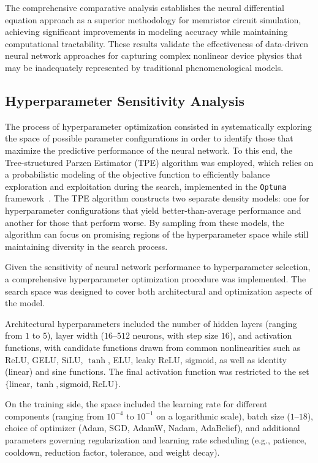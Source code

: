 \documentclass[11pt, oneside]{article}
\begin{document}
The comprehensive comparative analysis establishes the neural differential equation approach as a superior methodology for memristor circuit simulation, achieving significant improvements in modeling accuracy while maintaining computational tractability. These results validate the effectiveness of data-driven neural network approaches for capturing complex nonlinear device physics that may be inadequately represented by traditional phenomenological models.

\subsection{Hyperparameter Sensitivity Analysis}

The process of hyperparameter optimization consisted in systematically exploring the space of possible parameter configurations in order to identify those that maximize the predictive performance of the neural network. To this end, the Tree-structured Parzen Estimator (TPE) algorithm was employed, which relies on a probabilistic modeling of the objective function to efficiently balance exploration and exploitation during the search, implemented in the \verb|Optuna| framework~\cite{akiba2019optuna}. The TPE algorithm constructs two separate density models: one for hyperparameter configurations that yield better-than-average performance and another for those that perform worse. By sampling from these models, the algorithm can focus on promising regions of the hyperparameter space while still maintaining diversity in the search process.


Given the sensitivity of neural network performance to hyperparameter selection, a comprehensive hyperparameter optimization procedure was implemented. The search space was designed to cover both architectural and optimization aspects of the model.

Architectural hyperparameters included the number of hidden layers (ranging from $1$ to $5$), layer width ($16$--$512$ neurons, with step size $16$), and activation functions, with candidate functions drawn from common nonlinearities such as ReLU, GELU, SiLU, $\tanh$, ELU, leaky ReLU, sigmoid, as well as identity (linear) and sine functions. The final activation function was restricted to the set $\{\text{linear}, \tanh, \text{sigmoid}, \text{ReLU}\}$.

On the training side, the space included the learning rate for different components (ranging from $10^{-4}$ to $10^{-1}$ on a logarithmic scale), batch size ($1$--$18$), choice of optimizer (Adam, SGD, AdamW, Nadam, AdaBelief), and additional parameters governing regularization and learning rate scheduling (e.g., patience, cooldown, reduction factor, tolerance, and weight decay).
\end{document}
